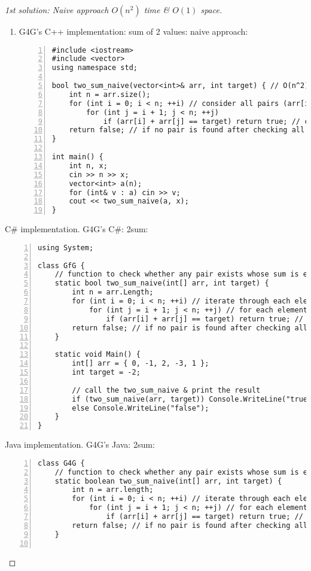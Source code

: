 \documentclass{article}
\begin{document}
\begin{proof}[1st solution: Naive approach $O(n^2)$ time \& $O(1)$ space]
\begin{enumerate}
        {\sf Worst-case analysis.} +++
        \item G4G's C++ implementation: sum of 2 values: naive approach:
        \begin{Verbatim}[numbers=left,xleftmargin=5mm]
#include <iostream>
#include <vector>
using namespace std;

bool two_sum_naive(vector<int>& arr, int target) { // O(n^2) time & O(1) space
    int n = arr.size();
    for (int i = 0; i < n; ++i) // consider all pairs (arr[i], arr[j])
        for (int j = i + 1; j < n; ++j)
            if (arr[i] + arr[j] == target) return true; // check if the sum of the current pair equals the target
    return false; // if no pair is found after checking all pairs
}

int main() {
    int n, x;
    cin >> n >> x;
    vector<int> a(n);
    for (int& v : a) cin >> v;
    cout << two_sum_naive(a, x);
}
        \end{Verbatim}
    \end{enumerate}
    \item {\sf C\# implementation.} G4G's C\#: 2sum:
    \begin{Verbatim}[numbers=left,xleftmargin=5mm]
using System;

class GfG {
    // function to check whether any pair exists whose sum is equal to the given target value
    static bool two_sum_naive(int[] arr, int target) {
        int n = arr.Length;
        for (int i = 0; i < n; ++i) // iterate through each element in the array
            for (int j = i + 1; j < n; ++j) // for each element arr[i], check every other element arr[j] that comes after it
                if (arr[i] + arr[j] == target) return true; // check if the sum of the current pair equals the target
        return false; // if no pair is found after checking all possibilities
    }

    static void Main() {
        int[] arr = { 0, -1, 2, -3, 1 };
        int target = -2;

        // call the two_sum_naive & print the result
        if (two_sum_naive(arr, target)) Console.WriteLine("true");
        else Console.WriteLine("false");
    }
}
    \end{Verbatim}
    \item {\sf Java implementation.} G4G's Java: 2sum:
    \begin{Verbatim}[numbers=left,xleftmargin=5mm]
class G4G {
    // function to check whether any pair exists whose sum is equal to the given target value
    static boolean two_sum_naive(int[] arr, int target) {
        int n = arr.length;
        for (int i = 0; i < n; ++i) // iterate through each element in the array
            for (int j = i + 1; j < n; ++j) // for each element arr[i], check every other element arr[j] that comes after it
                if (arr[i] + arr[j] == target) return true; // check if the sum of the current pair equals the target
        return false; // if no pair is found after checking all possibilities
    }


\end{Verbatim}
\end{proof}
\end{document}
